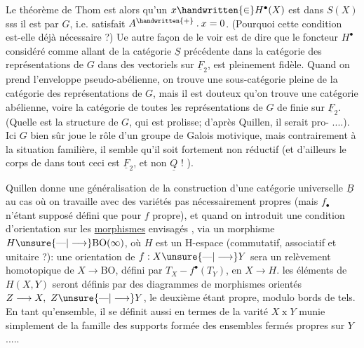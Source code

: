 
Le théorème de Thom est alors qu'un $x\handwritten{\in}H^{\bullet}(X)$ est dans $S(X)$ sss il est   par $G$, i.e. satisfait $A^{\handwritten{+}}\mathbin{.}x=0$. (Pourquoi cette condition est-elle déjà nécessaire ?) Ue autre façon de le voir est de dire que le foncteur $H^{\bullet}$ considéré comme allant de la catégorie $\underline S$ précédente dans la catégorie des  représentations de $G$ dans des vectoriels sur $\underline F_2$, est pleinement fidèle.  Quand on prend l'enveloppe pseudo-abélienne, on trouve une sous-catégorie pleine de la catégorie des représentations de $G$, mais il est douteux qu'on trouve une catégorie abélienne, voire la catégorie de toutes les représentations de $G$ de  finie sur $\underline F_2$. (Quelle est la structure de $G$, qui est prolisse; d'après Quillen, il serait pro- ....). Ici $G$ bien sûr joue le rôle d'un groupe de Galois motivique, mais contrairement à la situation familière, il semble qu'il soit fortement non réductif (et d'ailleurs le corps de  dans tout ceci est $\underline F_2$, et non $\underline Q$ ! ).

Quillen donne une généralisation de la construction d'une catégorie universelle $\underline B$ au cas où on travaille avec des variétés pas nécessairement propres (mais $f_{\bullet}$ n'étant supposé défini que pour $f$ propre), et quand on introduit une condition d'orientation  sur les \uline{morphismes} envisagés , via un morphisme $H\unsure{\text{---}|\longrightarrow}\mathrm{BO}(\infty)$, où $H$ est un H-espace (commutatif, associatif et unitaire ?): une orientation de $f:X\unsure{\text{---}|\longrightarrow}Y$ sera un relèvement homotopique de $X\longrightarrow\mathrm{BO}$, défini par  $T_X-f^{\bullet}(T_Y)$, en $X\longrightarrow H$. les éléments de $H(X,Y)$ seront définis par des diagrammes de morphismes orientés $Z\longrightarrow X,\ Z\unsure{\text{---}|\longrightarrow}Y$, le deuxième étant propre, modulo bords de tels. En tant qu'ensemble, il se définit aussi en termes de la varité $X\mathbin{x}Y$ munie simplement de la famille des supports formée des ensembles fermés propres sur $Y$ .....




